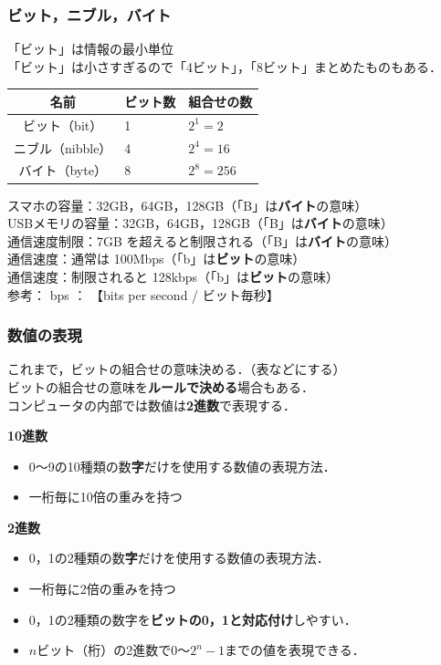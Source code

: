 \documentclass{beamer}                 %
\begin{document}
\begin{frame}
  \frametitle{ビット，ニブル，バイト}
  「ビット」は情報の最小単位 \\
  「ビット」は小さすぎるので「4ビット」，「8ビット」まとめたものもある．

  \begin{center}
    \begin{tabular}{c|l|l} \hline\hline
      名前 & ビット数 & 組合せの数\\
      \hline
      ビット（bit）    & 1   & $2^1 = 2$ \\
      ニブル（nibble） & 4   & $2^4 = 16$ \\
      バイト（byte） & 8   & $2^8 = 256$ \\
    \end{tabular}
  \end{center}

  スマホの容量：32GB，64GB，128GB（「B」は{\bf バイト}の意味） \\
  USBメモリの容量：32GB，64GB，128GB（「B」は{\bf バイト}の意味） \\
  通信速度制限：7GB を超えると制限される（「B」は{\bf バイト}の意味） \\
  通信速度：通常は 100Mbps（「b」は{\bf ビット}の意味） \\
  通信速度：制限されると 128kbps（「b」は{\bf ビット}の意味） \\

  参考： bps ： 【bits per second / ビット毎秒】
\end{frame}

\begin{frame}
  \frametitle{数値の表現}
  これまで，ビットの組合せの意味決める．（表などにする） \\
  ビットの組合せの意味を{\bf ルールで決める}場合もある．\\
  コンピュータの内部では数値は{\bf 2進数}で表現する．

  {\bf 10進数} \\
  \begin{itemize}
    \item 0〜9の10種類の数{\bf 字}だけを使用する数値の表現方法．
    \item 一桁毎に10倍の重みを持つ
  \end{itemize}

  {\bf 2進数} \\
  \begin{itemize}
    \item 0，1の2種類の数{\bf 字}だけを使用する数値の表現方法．
    \item 一桁毎に2倍の重みを持つ
    \item 0，1の2種類の数字を{\bf ビットの0，1と対応付け}しやすい．
    \item $n$ビット（桁）の2進数で$0$〜$2^n-1$までの値を表現できる．
  \end{itemize}

\end{frame}
\end{document}
